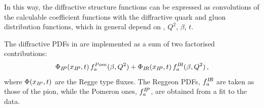 In this way, the diffractive structure functions can be expressed as convolutions of the
calculable coefficient functions with the diffractive quark and gluon distribution functions,
 which in general depend on \xpom, $Q^2$, $\beta$, $t$.

The diffractive PDFs in \fitter \cite{Aktas:2006hy, zeus:diff2009} are implemented as a sum 
of two factorised contributions:
\begin{equation}
 \Phi_{I\!P}(x_{I\!P},t)\, f^{Pom}_{a}(\beta,Q^2)
  + 
 \Phi_{I\!R}(x_{I\!P},t)\, f^{{I\!R}}_{a}(\beta,Q^2)
 \,,
\end{equation} 
where $\Phi(x_{I\!P},t)$ are the Regge type fluxes.
The Reggeon PDFs, $f^{{I\!R}}_{a}$ are taken as those of the pion, while the Pomeron ones,
$f^{{I\!P}}_{a}$, are obtained from a fit to the data.

